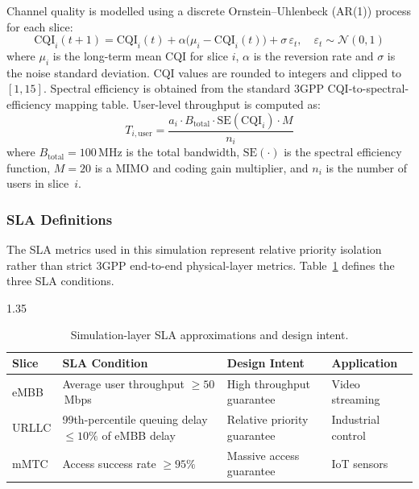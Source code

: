 Channel quality is modelled using a discrete Ornstein--Uhlenbeck (AR(1)) process for each slice:
\begin{equation}
    \text{CQI}_i(t+1) = \text{CQI}_i(t) + \alpha\bigl(\mu_i - \text{CQI}_i(t)\bigr) + \sigma\,\varepsilon_t, \quad \varepsilon_t \sim \mathcal{N}(0,1)
    \label{eq:cqi}
\end{equation}
where $\mu_i$ is the long-term mean CQI for slice $i$, $\alpha$ is the reversion rate and $\sigma$ is the noise standard deviation. CQI values are rounded to integers and clipped to $[1, 15]$. Spectral efficiency is obtained from the standard 3GPP CQI-to-spectral-efficiency mapping table. User-level throughput is computed as:
\begin{equation}
    T_{i,\text{user}} = \frac{a_i \cdot B_{\text{total}} \cdot \text{SE}(\text{CQI}_i) \cdot M}{n_i}
    \label{eq:throughput}
\end{equation}
where $B_{\text{total}} = 100$\,MHz is the total bandwidth, $\text{SE}(\cdot)$ is the spectral efficiency function, $M = 20$ is a MIMO and coding gain multiplier, and $n_i$ is the number of users in slice~$i$.

\subsubsection{SLA Definitions}

The SLA metrics used in this simulation represent relative priority isolation rather than strict 3GPP end-to-end physical-layer metrics. Table~\ref{table:sla} defines the three SLA conditions.

\begin{table}[h]
  \centering
  \begin{spacing}{1.35}
  \caption{Simulation-layer SLA approximations and design intent.}\vspace{0.7em}
  \label{table:sla}
    \begin{tabular}{|p{1.8cm}|p{5.5cm}|p{3.5cm}|p{2.5cm}|}
    \hline
    \textbf{Slice} & \textbf{SLA Condition} & \textbf{Design Intent} & \textbf{Application} \\
    \hline
    eMBB & Average user throughput $\geq 50$\,Mbps & High throughput guarantee & Video streaming \\
    \hline
    URLLC & 99th-percentile queuing delay $\leq 10\%$ of eMBB delay & Relative priority guarantee & Industrial control \\
    \hline
    mMTC & Access success rate $\geq 95\%$ & Massive access guarantee & IoT sensors \\
    \hline
    \end{tabular}
  \end{spacing}
\end{table}

